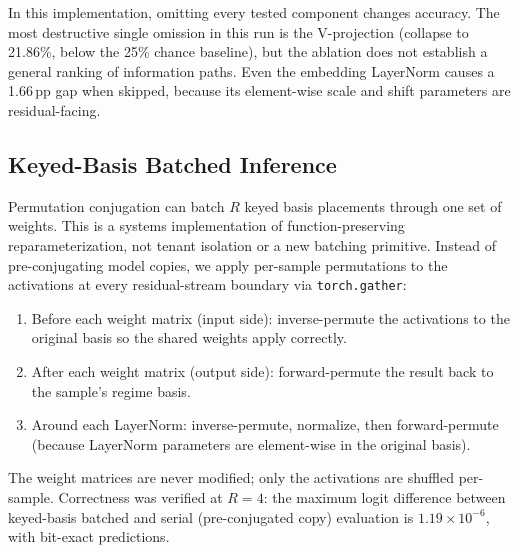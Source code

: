 \documentclass[11pt,a4paper]{article}
\begin{document}
In this implementation, omitting every tested component changes
accuracy.  The most destructive single omission in this run is the
V-projection (collapse to 21.86\%, below the 25\% chance baseline),
but the ablation does not establish a general ranking of information
paths.  Even the embedding LayerNorm causes a 1.66\,pp gap when
skipped, because its element-wise scale and shift parameters are
residual-facing.

\subsection{Keyed-Basis Batched Inference}
\label{sec:true-multiplexing}

Permutation conjugation can batch $R$ keyed basis placements through
one set of weights.  This is a systems implementation of
function-preserving reparameterization, not tenant isolation or a new
batching primitive.  Instead of
pre-conjugating model copies, we apply per-sample permutations to
the activations at every residual-stream boundary via
\texttt{torch.gather}:

\begin{enumerate}[nosep]
    \item Before each weight matrix (input side): inverse-permute
    the activations to the original basis so the shared weights
    apply correctly.
    \item After each weight matrix (output side): forward-permute
    the result back to the sample's regime basis.
    \item Around each LayerNorm: inverse-permute, normalize, then
    forward-permute (because LayerNorm parameters are
    element-wise in the original basis).
\end{enumerate}

The weight matrices are never modified; only the activations are
shuffled per-sample.  Correctness was verified at $R{=}4$: the
maximum logit difference between keyed-basis batched and serial
(pre-conjugated copy) evaluation is $1.19 \times 10^{-6}$, with
bit-exact predictions.
\end{document}
